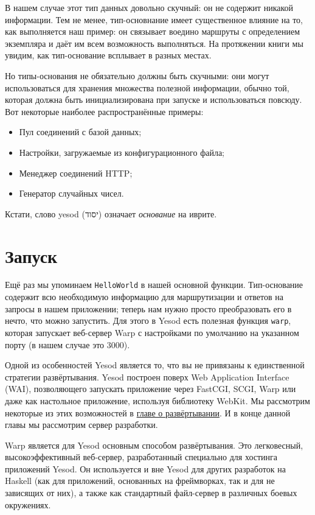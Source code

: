 В нашем случае этот тип данных довольно скучный: он не содержит никакой
информации. Тем не менее, тип-основнание имеет существенное влияние на то, как
выполняется наш пример: он связывает воедино маршруты с определением экземпляра
и даёт им всем возможность выполняться. На протяжении книги мы увидим, как
тип-основание всплывает в разных местах.

Но типы-основания не обязательно должны быть скучными: они могут использоваться
для хранения множества полезной информации, обычно той, которая должна быть
инициализирована при запуске и использоваться повсюду. Вот некоторые наиболее
распространённые примеры:

\begin{itemize}
  \item Пул соединений с базой данных;
  \item Настройки, загружаемые из конфигурационного файла;
  \item Менеджер соединений HTTP;
  \item Генератор случайных чисел.
\end{itemize}

\begin{remark}
    Кстати, слово yesod (\textsf{יסוד}) означает \emph{основание} на иврите.
\end{remark}

\section{Запуск}

Ещё раз мы упоминаем \lstinline!HelloWorld! в нашей основной функции.
Тип-основание содержит всю необходимую информацию для маршрутизации и ответов
на запросы в нашем приложении; теперь нам нужно просто преобразовать его в
нечто, что можно запустить. Для этого в Yesod есть полезная функция
\lstinline!warp!, которая запускает веб-сервер Warp с настройками по умолчанию
на указанном порту (в нашем случае это 3000).

Одной из особенностей Yesod является то, что вы не привязаны к единственной
стратегии развёртывания. Yesod построен поверх Web Application Interface (WAI),
позволяющего запускать приложение через FastCGI, SCGI, Warp или даже как
настольное приложение, используя библиотеку WebKit. Мы рассмотрим некоторые из
этих возможностей в \hyperref[chap:deploying]{главе о развёртывании}. И в конце
данной главы мы рассмотрим сервер разработки.

Warp является для Yesod основным способом развёртывания. Это легковесный,
высокоэффективный веб-сервер, разработанный специально для хостинга приложений
Yesod. Он используется и вне Yesod для других разработок на Haskell (как для
приложений, основанных на фреймворках, так и для не зависящих от них), а также
как стандартный файл-сервер в различных боевых окружениях.

